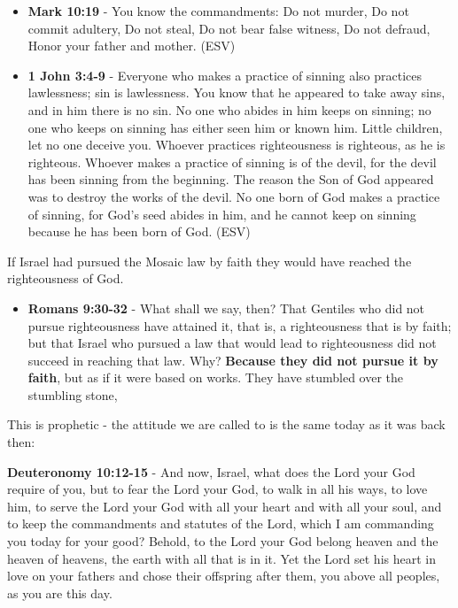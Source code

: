\documentclass[11pt]{article}
\begin{document}
\begin{itemize}
\item \textbf{Mark 10:19} - You know the commandments: Do not murder, Do not commit adultery, Do not steal, Do not bear false witness, Do not defraud, Honor your father and mother. (ESV)
\item \textbf{1 John 3:4-9} - Everyone who makes a practice of sinning also practices lawlessness; sin is lawlessness.  You know that he appeared to take away sins, and in him there is no sin.  No one who abides in him keeps on sinning; no one who keeps on sinning has either seen him or known him.  Little children, let no one deceive you.  Whoever practices righteousness is righteous, as he is righteous.  Whoever makes a practice of sinning is of the devil, for the devil has been sinning from the beginning.  The reason the Son of God appeared was to destroy the works of the devil.  No one born of God makes a practice of sinning, for God's seed abides in him, and he cannot keep on sinning because he has been born of God.  (ESV)
\end{itemize}

If Israel had pursued the Mosaic law by faith they would have reached the righteousness of God.

\begin{itemize}
\item \textbf{Romans 9:30-32} - What shall we say, then? That Gentiles who did not pursue righteousness have attained it, that is, a righteousness that is by faith; but that Israel who pursued a law that would lead to righteousness did not succeed in reaching that law.  Why? \textbf{Because they did not pursue it by faith}, but as if it were based on works. They have stumbled over the stumbling stone,
\end{itemize}

This is prophetic - the attitude we are called to is the same today as it was back then:

\textbf{Deuteronomy 10:12-15} - And now, Israel, what does the Lord your God require of you, but to fear the Lord your God, to walk in all his ways, to love him, to serve the Lord your God with all your heart and with all your soul, and to keep the commandments and statutes of the Lord, which I am commanding you today for your good? Behold, to the Lord your God belong heaven and the heaven of heavens, the earth with all that is in it. Yet the Lord set his heart in love on your fathers and chose their offspring after them, you above all peoples, as you are this day.
\end{document}
